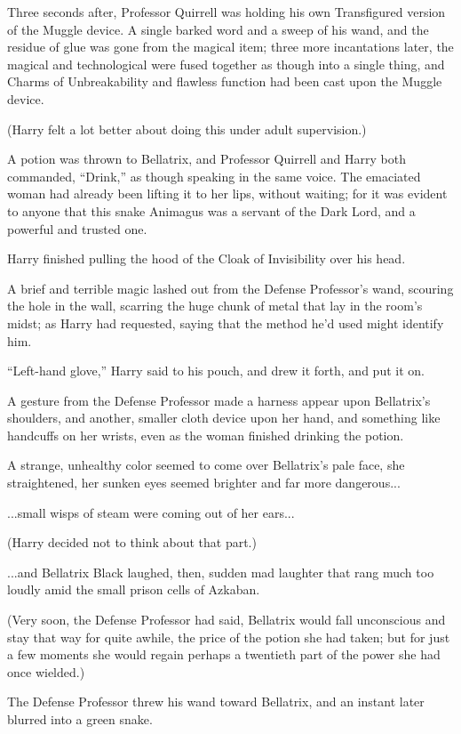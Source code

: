 Three seconds after, Professor Quirrell was holding his own Transfigured version of the Muggle device. A single barked word and a sweep of his wand, and the residue of glue was gone from the magical item; three more incantations later, the magical and technological were fused together as though into a single thing, and Charms of Unbreakability and flawless function had been cast upon the Muggle device.

(Harry felt a lot better about doing this under adult supervision.)

A potion was thrown to Bellatrix, and Professor Quirrell and Harry both commanded, “Drink,” as though speaking in the same voice. The emaciated woman had already been lifting it to her lips, without waiting; for it was evident to anyone that this snake Animagus was a servant of the Dark Lord, and a powerful and trusted one.

Harry finished pulling the hood of the Cloak of Invisibility over his head.

A brief and terrible magic lashed out from the Defense Professor’s wand, scouring the hole in the wall, scarring the huge chunk of metal that lay in the room’s midst; as Harry had requested, saying that the method he’d used might identify him.

“Left-hand glove,” Harry said to his pouch, and drew it forth, and put it on.

A gesture from the Defense Professor made a harness appear upon Bellatrix’s shoulders, and another, smaller cloth device upon her hand, and something like handcuffs on her wrists, even as the woman finished drinking the potion.

A strange, unhealthy color seemed to come over Bellatrix’s pale face, she straightened, her sunken eyes seemed brighter and far more dangerous...

...small wisps of steam were coming out of her ears...

(Harry decided not to think about that part.)

...and Bellatrix Black laughed, then, sudden mad laughter that rang much too loudly amid the small prison cells of Azkaban.

(Very soon, the Defense Professor had said, Bellatrix would fall unconscious and stay that way for quite awhile, the price of the potion she had taken; but for just a few moments she would regain perhaps a twentieth part of the power she had once wielded.)

The Defense Professor threw his wand toward Bellatrix, and an instant later blurred into a green snake.

